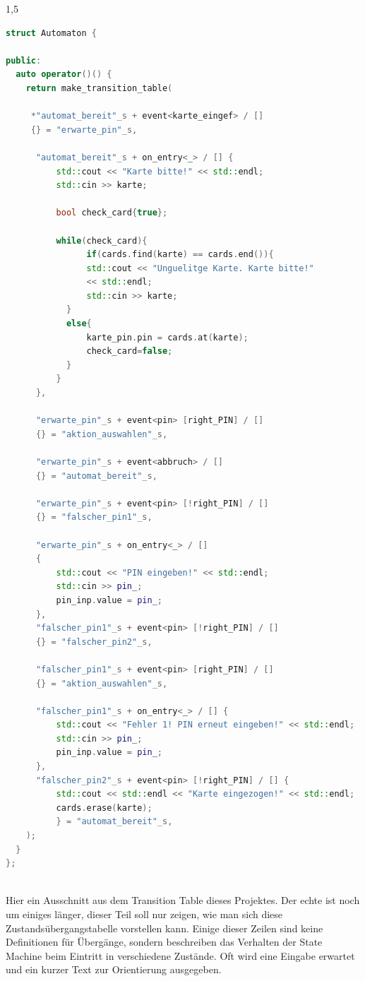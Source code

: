 \documentclass[a4paper]{article}
\begin{document}
\begin{spacing}{1,5}
\begin{lstlisting}[language=c++]
struct Automaton {

public:
  auto operator()() {
    return make_transition_table(
    
     *"automat_bereit"_s + event<karte_eingef> / []
     {} = "erwarte_pin"_s,
     
      "automat_bereit"_s + on_entry<_> / [] {
          std::cout << "Karte bitte!" << std::endl;
          std::cin >> karte;

          bool check_card{true};

          while(check_card){
                if(cards.find(karte) == cards.end()){
                std::cout << "Unguelitge Karte. Karte bitte!"
                << std::endl;
                std::cin >> karte;
            }
            else{
                karte_pin.pin = cards.at(karte);
                check_card=false;
            }
          }      
      },
      
      "erwarte_pin"_s + event<pin> [right_PIN] / []
      {} = "aktion_auswahlen"_s,
      
      "erwarte_pin"_s + event<abbruch> / []
      {} = "automat_bereit"_s,
      
      "erwarte_pin"_s + event<pin> [!right_PIN] / []
      {} = "falscher_pin1"_s,
      
      "erwarte_pin"_s + on_entry<_> / []
      {
          std::cout << "PIN eingeben!" << std::endl; 
          std::cin >> pin_;
          pin_inp.value = pin_;        
      },
      "falscher_pin1"_s + event<pin> [!right_PIN] / []
      {} = "falscher_pin2"_s,
      
      "falscher_pin1"_s + event<pin> [right_PIN] / []
      {} = "aktion_auswahlen"_s,
      
      "falscher_pin1"_s + on_entry<_> / [] {
          std::cout << "Fehler 1! PIN erneut eingeben!" << std::endl;
          std::cin >> pin_;
          pin_inp.value = pin_;
      },
      "falscher_pin2"_s + event<pin> [!right_PIN] / [] {
          std::cout << std::endl << "Karte eingezogen!" << std::endl;
          cards.erase(karte);
          } = "automat_bereit"_s,
    );
  }
};
	
\end{lstlisting}
Hier ein Ausschnitt aus dem Transition Table dieses Projektes. Der echte ist noch um einiges länger, dieser Teil soll nur zeigen, wie man sich diese Zustandsübergangstabelle vorstellen kann. Einige dieser Zeilen sind keine Definitionen für Übergänge, sondern beschreiben das Verhalten der State Machine beim Eintritt in verschiedene Zustände. Oft wird eine Eingabe erwartet und ein kurzer Text zur Orientierung ausgegeben.\newline\newline


\end{spacing}
\end{document}
